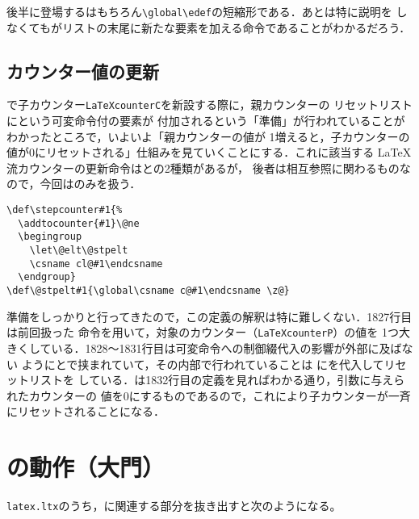 \documentclass[autodetect-engine,dvipdfmx]{jsarticle}
\begin{document}
後半に登場するはもちろん\verb|\global\edef|の短縮形である．あとは特に説明を
しなくてもがリストの末尾に新たな要素を加える命令であることがわかるだろう．

\subsection{カウンター値の更新}

で子カウンター\texttt{LaTeXcounterC}を新設する際に，親カウンターの
リセットリストにという可変命令付の要素が
付加されるという「準備」が行われていることがわかったところで，いよいよ「親カウンターの値が
1増えると，子カウンターの値が0にリセットされる」仕組みを見ていくことにする．これに該当する
\LaTeX 流カウンターの更新命令はとの2種類があるが，
後者は相互参照に関わるものなので，今回はのみを扱う．

\latexltx
\begin{lstlisting}[firstnumber=1826]
\def\stepcounter#1{%
  \addtocounter{#1}\@ne
  \begingroup
    \let\@elt\@stpelt
    \csname cl@#1\endcsname
  \endgroup}
\def\@stpelt#1{\global\csname c@#1\endcsname \z@}
\end{lstlisting}

準備をしっかりと行ってきたので，この定義の解釈は特に難しくない．1827行目は前回扱った
命令を用いて，対象のカウンター（\texttt{LaTeXcounterP}）の値を
1つ大きくしている．1828〜1831行目は可変命令への制御綴代入の影響が外部に及ばない
ようにとで挟まれていて，その内部で行われていることは
にを代入してリセットリストを
している．は1832行目の定義を見ればわかる通り，引数に与えられたカウンターの
値を0にするものであるので，これにより子カウンターが一斉にリセットされることになる．

\newpage

\section{の動作（大門）}

\texttt{latex.ltx}のうち，に関連する部分を抜き出すと次のようになる。
\end{document}
